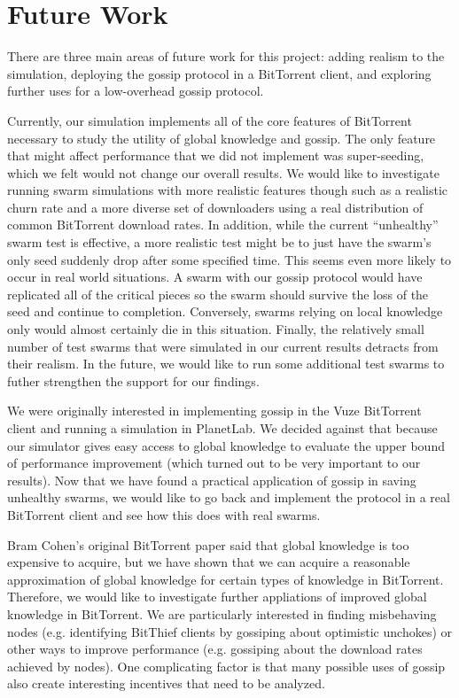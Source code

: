 \section{Future Work}

There are three main areas of future work for this project: adding realism 
to the simulation, deploying the gossip protocol in a BitTorrent client,
and exploring further uses for a low-overhead gossip protocol. 

Currently, our simulation implements all of the core features of
BitTorrent necessary to study the utility of global knowledge and
gossip. The only feature that might affect performance that we did not
implement was super-seeding, which we felt would not change our overall
results. We would like to investigate running swarm simulations with
more realistic features though such as a realistic churn rate and a more
diverse set of downloaders using a real distribution of common BitTorrent
download rates. In addition, while the current ``unhealthy'' swarm test is
effective, a more realistic test might be to just have the swarm's only
seed suddenly drop after some specified time. This seems even more likely to
occur in real world situations. A swarm with our gossip protocol would have
replicated all of the critical pieces so the swarm should survive the loss of
the seed and continue to completion. Conversely, swarms relying on local 
knowledge only would almost certainly die in this situation. Finally, the
relatively small number of test swarms that were simulated in our current
results detracts from their realism. In the future, we would like
to run some additional test swarms to futher strengthen the support for our
findings.

We were originally interested in implementing gossip in the Vuze BitTorrent client
and running a simulation in PlanetLab. We decided against that because our simulator
gives easy access to global knowledge to evaluate the upper bound of performance improvement
(which turned out to be very important to our results). Now that we have found a practical
application of gossip in saving unhealthy swarms, we would like to go back and implement
the protocol in a real BitTorrent client and see how this does with real swarms.


Bram Cohen's original BitTorrent paper said that global knowledge is too expensive to acquire,
but we have shown that we can acquire a reasonable approximation of global knowledge
for certain types of knowledge in BitTorrent. Therefore, we would like to investigate
further appliations of improved global knowledge in BitTorrent. We are particularly interested in 
finding misbehaving nodes (e.g. identifying BitThief clients by gossiping about optimistic unchokes)
or other ways to improve performance (e.g. gossiping about the download rates achieved by nodes).
One complicating factor is that many possible uses of gossip also create interesting incentives
that need to be analyzed.


